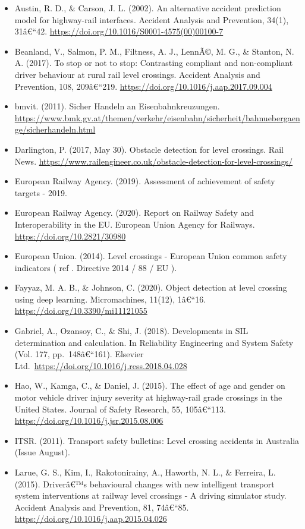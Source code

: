 \documentclass[
]{book}
\providecommand{\tightlist}{%
  \setlength{\itemsep}{0pt}\setlength{\parskip}{0pt}}
\begin{document}
\begin{itemize}
\tightlist
\item
  Austin, R. D., \& Carson, J. L. (2002). An alternative accident prediction model for highway-rail interfaces. Accident Analysis and Prevention, 34(1), 31â€``42. \url{https://doi.org/10.1016/S0001-4575(00)00100-7}
\item
  Beanland, V., Salmon, P. M., Filtness, A. J., LennÃ©, M. G., \& Stanton, N. A. (2017). To stop or not to stop: Contrasting compliant and non-compliant driver behaviour at rural rail level crossings. Accident Analysis and Prevention, 108, 209â€``219. \url{https://doi.org/10.1016/j.aap.2017.09.004}
\item
  bmvit. (2011). Sicher Handeln an Eisenbahnkreuzungen. \url{https://www.bmk.gv.at/themen/verkehr/eisenbahn/sicherheit/bahnuebergaenge/sicherhandeln.html}
\item
  Darlington, P. (2017, May 30). Obstacle detection for level crossings. Rail News. \url{https://www.railengineer.co.uk/obstacle-detection-for-level-crossings/}
\item
  European Railway Agency. (2019). Assessment of achievement of safety targets - 2019.
\item
  European Railway Agency. (2020). Report on Railway Safety and Interoperability in the EU. European Union Agency for Railways. \url{https://doi.org/10.2821/30980}
\item
  European Union. (2014). Level crossings - European Union common safety indicators ( ref . Directive 2014 / 88 / EU ).
\item
  Fayyaz, M. A. B., \& Johnson, C. (2020). Object detection at level crossing using deep learning. Micromachines, 11(12), 1â€``16. \url{https://doi.org/10.3390/mi11121055}
\item
  Gabriel, A., Ozansoy, C., \& Shi, J. (2018). Developments in SIL determination and calculation. In Reliability Engineering and System Safety (Vol. 177, pp.~148â€``161). Elsevier Ltd.~\url{https://doi.org/10.1016/j.ress.2018.04.028}
\item
  Hao, W., Kamga, C., \& Daniel, J. (2015). The effect of age and gender on motor vehicle driver injury severity at highway-rail grade crossings in the United States. Journal of Safety Research, 55, 105â€``113. \url{https://doi.org/10.1016/j.jsr.2015.08.006}
\item
  ITSR. (2011). Transport safety bulletins: Level crossing accidents in Australia (Issue August).
\item
  Larue, G. S., Kim, I., Rakotonirainy, A., Haworth, N. L., \& Ferreira, L. (2015). Driverâ€™s behavioural changes with new intelligent transport system interventions at railway level crossings - A driving simulator study. Accident Analysis and Prevention, 81, 74â€``85. \url{https://doi.org/10.1016/j.aap.2015.04.026}

\end{itemize}
\end{document}
